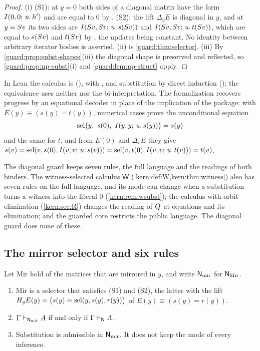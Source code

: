 \begin{proof}
(i) (S1): at $y=0$ both sides of a diagonal matrix have the form
$I(0,0;\,u.\,h')$ and are equal to $0$ by .  (S2): the lift
$\Delta_yE$ is diagonal in $y$, and at $y=S v$ its two sides are
$I(S v,S v;\,u.\,s(S v))$ and $I(S v,S v;\,u.\,t(S v))$,
which are equal to $s(S v)$ and $t(S v)$ by , the updates
being constant.  No identity between arbitrary iterator bodies is asserted.
(ii) is \cref{guard:thm:selector}.  (iii) By
\cref{guard:prop:subst-shapes}(iii) the diagonal shape is preserved and
reflected, so \cref{guard:prop:np-subst}(i) and \cref{guard:lem:np-struct}
apply.
\end{proof}

In Lean the calculus is  (), with
,  and substitution by direct
induction (); the equivalence uses neither
 nor the bi-interpretation.  The formalization
recovers progress by an equational decoder in place of the implication of
the package: with $E(y)\equiv(s(y)=t(y))$, numerical cases prove the
unconditional equation
\[
 \sel\bigl(y,\ s(0),\ \It{y}{y}{u}{s(y)}\bigr)=s(y)
\]
and the same for $t$, and from $E(0)$ and $\Delta_vE$ they give
$s(v)=\operatorname{sel}(v,s(0),I(v,v;\,u.\,s(v)))=\operatorname{sel}(v,t(0),I(v,v;\,u.\,t(v)))=t(v)$.

The diagonal guard keeps seven rules, the full language and the readings of
both binders.  The witness-selected calculus $\mathsf W$
(\cref{kern:def:W,kern:thm:witness}) also has seven rules on the full
language, and its mode can change when a substitution turns a witness into
the literal $0$ (\cref{kern:rem:wsubst}); the calculus with orbit
elimination (\cref{kern:sec:R}) changes the reading of $Q_{}$ at equations
and its elimination; and the guarded core restricts the public language.  The
diagonal guard does none of these.

\subsection{The mirror selector and six rules}

\begin{theorem}
\label{guard:thm:mirror-selector}
Let $\mathrm{Mir}$ hold of the matrices that are mirrored in $y$, and write
$\mathsf{N}_{\mathrm{mir}}$ for $\mathsf{N}_{\mathrm{Mir}}$.
\begin{enumerate}[label=\textup{(\roman*)}]
\item $\mathrm{Mir}$ is a selector that satisfies \textup{(S1)} and
 \textup{(S2)}, the latter with the lift
 $H_yE(y)=\bigl(s(y)=\operatorname{sel}(y,s(y),r(y))\bigr)$ of $E(y)\equiv(s(y)=r(y))$.
\item $\Gamma\vdash_{\mathsf{N}_{\mathrm{mir}}}A$ if and only if
 $\Gamma\vdash_{\mathsf{N}}A$.
\item Substitution is admissible in $\mathsf{N}_{\mathrm{mir}}$.  It does not
 keep the mode of every inference.
\end{enumerate}
\end{theorem}

